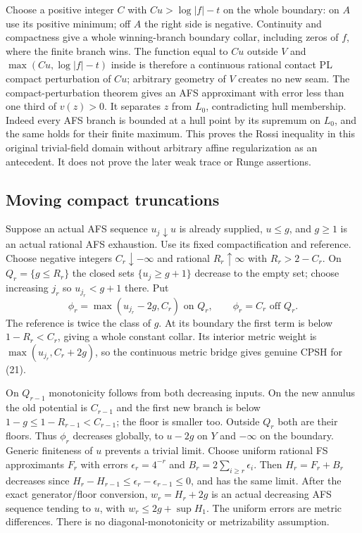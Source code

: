 \documentclass[
  11pt,
]{article}
\begin{document}
Choose a positive integer \(C\) with \(Cu>\log|f|-t\) on the whole
boundary: on \(A\) use its positive minimum; off \(A\) the right side is
negative. Continuity and compactness give a whole winning-branch
boundary collar, including zeros of \(f\), where the finite branch wins.
The function equal to \(Cu\) outside \(V\) and \(\max(Cu,\log|f|-t)\)
inside is therefore a continuous rational contact PL compact
perturbation of \(Cu\); arbitrary geometry of \(V\) creates no new seam.
The compact-perturbation theorem gives an AFS approximant with error
less than one third of \(v(z)>0\). It separates \(z\) from \(L_0\),
contradicting hull membership. Indeed every AFS branch is bounded at a
hull point by its supremum on \(L_0\), and the same holds for their
finite maximum. This proves the Rossi inequality in this original
trivial-field domain without arbitrary affine regularization as an
antecedent. It does not prove the later weak trace or Runge assertions.

\subsection{Moving compact
truncations}\label{moving-compact-truncations}

Suppose an actual AFS sequence \(u_j\downarrow u\) is already supplied,
\(u\le g\), and \(g\ge1\) is an actual rational AFS exhaustion. Use its
fixed compactification and reference. Choose negative integers
\(C_r\downarrow-\infty\) and rational \(R_r\uparrow\infty\) with
\(R_r>2-C_r\). On \(Q_r=\{g\le R_r\}\) the closed sets
\(\{u_j\ge g+1\}\) decrease to the empty set; choose increasing \(j_r\)
so \(u_{j_r}<g+1\) there. Put
\[\phi_r=\max(u_{j_r}-2g,C_r)\text{ on }Q_r,
            \qquad\phi_r=C_r\text{ off }Q_r. \tag{21}\] The reference is
twice the class of \(g\). At its boundary the first term is below
\(1-R_r<C_r\), giving a whole constant collar. Its interior metric
weight is \(\max(u_{j_r},C_r+2g)\), so the continuous metric bridge
gives genuine CPSH for (21).

On \(Q_{r-1}\) monotonicity follows from both decreasing inputs. On the
new annulus the old potential is \(C_{r-1}\) and the first new branch is
below \(1-g\le1-R_{r-1}<C_{r-1}\); the floor is smaller too. Outside
\(Q_r\) both are their floors. Thus \(\phi_r\) decreases globally, to
\(u-2g\) on \(Y\) and \(-\infty\) on the boundary. Generic finiteness of
\(u\) prevents a trivial limit. Choose uniform rational FS approximants
\(F_r\) with errors \(\epsilon_r=4^{-r}\) and
\(B_r=2\sum_{i\ge r}\epsilon_i\). Then \(H_r=F_r+B_r\) decreases since
\(H_r-H_{r-1}\le\epsilon_r-\epsilon_{r-1}\le0\), and has the same limit.
After the exact generator/floor conversion, \(w_r=H_r+2g\) is an actual
decreasing AFS sequence tending to \(u\), with \(w_r\le2g+\sup H_1\).
The uniform errors are metric differences. There is no
diagonal-monotonicity or metrizability assumption.
\end{document}
